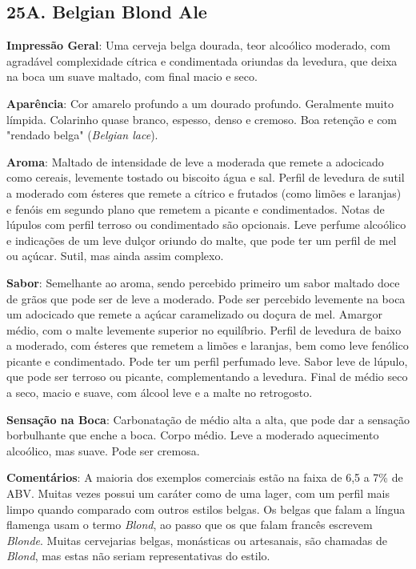 \subsection*{25A. Belgian Blond Ale}

\textbf{Impressão Geral}: Uma cerveja belga dourada, teor alcoólico moderado, com agradável complexidade cítrica e condimentada oriundas da levedura, que deixa na boca um suave maltado, com final macio e seco.

\textbf{Aparência}: Cor amarelo profundo a um dourado profundo. Geralmente muito límpida. Colarinho quase branco, espesso, denso e cremoso. Boa retenção e com "rendado belga" (\textit{Belgian lace}).

\textbf{Aroma}: Maltado de intensidade de leve a moderada que remete a adocicado como cereais, levemente tostado ou biscoito água e sal. Perfil de levedura de sutil a moderado com ésteres que remete a cítrico e frutados (como limões e laranjas) e fenóis em segundo plano que remetem a picante e condimentados. Notas de lúpulos com perfil terroso ou condimentado são opcionais. Leve perfume alcoólico e indicações de um leve dulçor oriundo do malte, que pode ter um perfil de mel ou açúcar. Sutil, mas ainda assim complexo.

\textbf{Sabor}: Semelhante ao aroma, sendo percebido primeiro um sabor maltado doce de grãos que pode ser de leve a moderado. Pode ser percebido levemente na boca um adocicado que remete a açúcar caramelizado ou doçura de mel. Amargor médio, com o malte levemente superior no equilíbrio. Perfil de levedura de baixo a moderado, com ésteres que remetem a limões e laranjas, bem como leve fenólico picante e condimentado. Pode ter um perfil perfumado leve. Sabor leve de lúpulo, que pode ser terroso ou picante, complementando a levedura. Final de médio seco a seco, macio e suave, com álcool leve e a malte no retrogosto.

\textbf{Sensação na Boca}: Carbonatação de médio alta a alta, que pode dar a sensação borbulhante que enche a boca. Corpo médio. Leve a moderado aquecimento alcoólico, mas suave. Pode ser cremosa.

\textbf{Comentários}: A maioria dos exemplos comerciais estão na faixa de 6,5 a 7\% de ABV. Muitas vezes possui um caráter como de uma lager, com um perfil mais limpo quando comparado com outros estilos belgas. Os belgas que falam a língua flamenga usam o termo \textit{Blond}, ao passo que os que falam francês escrevem \textit{Blonde}. Muitas cervejarias belgas, monásticas ou artesanais, são chamadas de \textit{Blond}, mas estas não seriam representativas do estilo.

